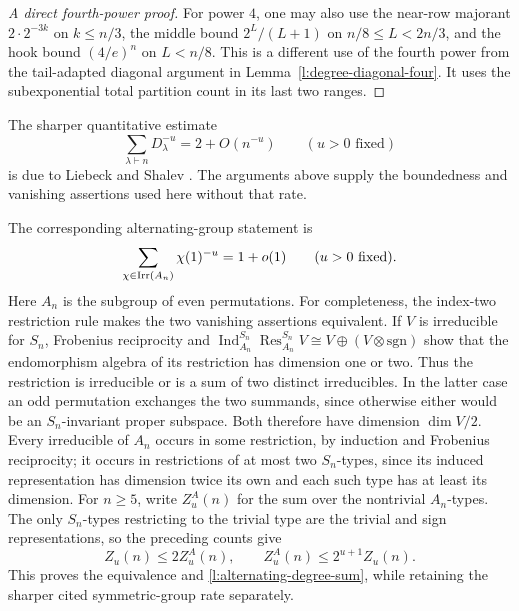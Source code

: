 \begin{proof}[A direct fourth-power proof]
\label{l:degree-direct-four}
For power $4$, one may also use the near-row majorant
$2\cdot2^{-3k}$ on $k\le n/3$, the middle bound
$2^L/(L+1)$ on $n/8\le L<2n/3$, and the hook bound $(4/e)^n$
on $L<n/8$.  This is a different use of the fourth power from
the tail-adapted diagonal argument in Lemma~\ref{l:degree-diagonal-four}.
It uses the subexponential total partition count in its last two ranges.
\end{proof}

The sharper quantitative estimate
\[
 \sum_{\lambda\vdash n}D_\lambda^{-u}=2+O(n^{-u})
 \qquad(u>0\text{ fixed})
\]
is due to Liebeck and Shalev \cite[Theorem~2.6]{liebeck-shalev2004}.
The arguments above supply the boundedness and vanishing assertions
used here without that rate.

The corresponding alternating-group statement is
\begin{equation}\label{l:alternating-degree-sum}
 \sum_{\chi\in\operatorname{Irr}(A_n)}\chi(1)^{-u}=1+o(1)
 \qquad(u>0\text{ fixed}).
\end{equation}
Here $A_n$ is the subgroup of even permutations.  For completeness,
the index-two restriction rule makes the two vanishing assertions
equivalent.  If $V$ is irreducible for $S_n$, Frobenius reciprocity and
$\operatorname{Ind}_{A_n}^{S_n}\operatorname{Res}_{A_n}^{S_n}V
 \cong V\oplus(V\otimes\mathrm{sgn})$
show that the endomorphism algebra of its restriction has dimension
one or two.  Thus the restriction is irreducible or is a sum of two
distinct irreducibles.  In the latter case an odd permutation exchanges
the two summands, since otherwise either would be an $S_n$-invariant
proper subspace.  Both therefore have dimension $\dim V/2$.
Every irreducible of $A_n$ occurs in some restriction, by induction and
Frobenius reciprocity; it occurs in restrictions of at most two
$S_n$-types, since its induced representation has dimension twice its
own and each such type has at least its dimension.
For $n\ge5$, write $Z_u^A(n)$ for the sum over the nontrivial
$A_n$-types.  The only $S_n$-types restricting to the trivial type
are the trivial and sign representations, so the preceding counts give
\[
 Z_u(n)\le2Z_u^A(n),\qquad
 Z_u^A(n)\le2^{u+1}Z_u(n).
\]
This proves the equivalence and \eqref{l:alternating-degree-sum}, while
retaining the sharper cited symmetric-group rate separately.
